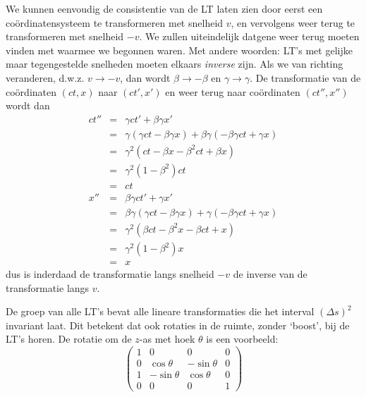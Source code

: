 We kunnen eenvoudig de consistentie van de LT laten zien door eerst een
co\"ordinatensysteem te transformeren met snelheid $v$, en vervolgens
weer terug te transformeren met snelheid $-v$. We zullen uiteindelijk
datgene weer terug moeten vinden met waarmee we begonnen waren. Met
andere woorden: LT's met gelijke maar tegengestelde
snelheden moeten elkaars {\sl inverse} zijn. Als we van richting
veranderen, d.w.z. $v\rightarrow -v$, dan wordt $\beta \rightarrow
-\beta$ en $\gamma \rightarrow \gamma$. De transformatie van de
co\"ordinaten $(ct,x)$ naar $(ct',x')$ en weer terug naar co\"ordinaten
$(ct'',x'')$ wordt dan
\begin{eqnarray} 
ct'' & = & \gamma ct' + \beta \gamma x' \\ \nonumber
     & = & \gamma ( \gamma ct -\beta \gamma x) + \beta \gamma (-\beta \gamma ct + \gamma x) \\ \nonumber
     & = & \gamma^2 (ct-\beta x - \beta^2 ct + \beta x)\\ \nonumber
     & = & \gamma^2 (1-\beta^2) ct \\ \nonumber
     & = & ct \\
x'' & = & \beta \gamma ct' + \gamma x' \\ \nonumber
     & = & \beta \gamma ( \gamma ct -\beta \gamma x) + \gamma (-\beta \gamma ct + \gamma x) \\\nonumber
     & = & \gamma^2 (\beta ct-\beta^2 x - \beta ct + x)\\\nonumber
     & = & \gamma^2 (1-\beta^2) x \\\nonumber
     & = & x 
\end{eqnarray}
dus is inderdaad de transformatie langs snelheid $-v$ de inverse van de transformatie langs $v$.

De groep van alle LT's bevat alle lineare transformaties die het interval $(\Delta s)^2$ 
invariant laat. Dit betekent dat ook rotaties in de ruimte, zonder `boost', bij de LT's horen. De
rotatie om de $z$-as met hoek $\theta$ is een voorbeeld:
\begin{equation}
\left( \begin{array}{cccc} 
    1 & 0 & 0 & 0 \\
    0 & \cos\theta & -\sin\theta & 0 \\
    1 & -\sin\theta & \cos\theta & 0 \\
    0 & 0 & 0 & 1 \end{array} \right)
\end{equation}

